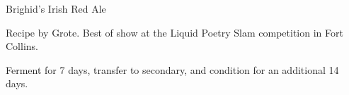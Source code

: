 \begin{recipe}{Brighid's Irish Red Ale}

\begin{aboutblock}
Recipe by Grote. Best of show at the Liquid Poetry Slam competition in
Fort Collins.  
\end{aboutblock}


\begin{methodandtiming}

\begin{directions}
Ferment for 7 days, transfer to secondary, and condition for an additional 14 days.
\end{directions}

\end{methodandtiming}

\recipebreak

\begin{ingredientsblock}

\begin{malts}
\end{malts}

\begin{hops}
\end{hops}


\end{ingredientsblock}

\end{recipe}

